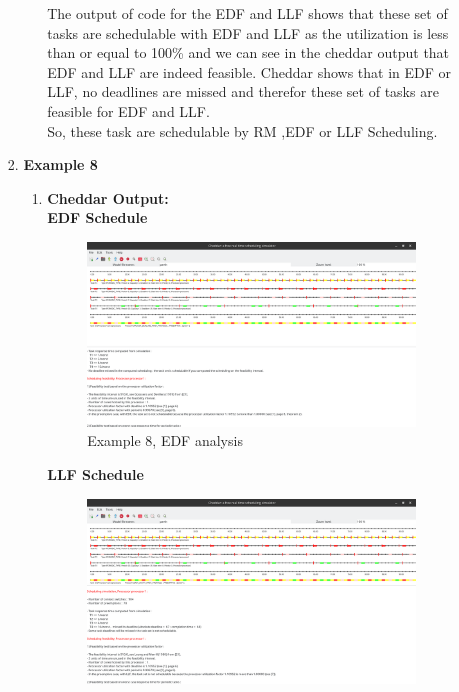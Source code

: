 \documentclass[a4paper,11pt]{article}%
\newenvironment{qanda}{\setlength{\parindent}{0pt}}{\bigskip}
\begin{document}
\begin{qanda}
\begin{enumerate}
\begin{enumerate}
\begin{enumerate}
\begin{enumerate}
						                  The output of code for the EDF and LLF shows that these set of tasks are schedulable with EDF and LLF as the utilization is less than or equal to 100\% and we can see in the cheddar output that EDF and LLF are indeed feasible. Cheddar shows that in EDF or LLF, no deadlines are missed and therefor these set of tasks are feasible for EDF and LLF.\\

						                  So, these task are schedulable by RM ,EDF or LLF Scheduling.

					            \end{enumerate}
					      \item \textbf{Example 8}
					            \begin{enumerate}
						            \item \textbf{Cheddar Output:}\\
						                  \textbf{EDF Schedule}
						                  \begin{figure}[H]
							                  \centering
							                  \includegraphics[scale=0.36]{figures/ex6_edf.png}
							                  \caption{Example 8, EDF analysis}
						                  \end{figure}
						                  \textbf{LLF Schedule}
						                  \begin{figure}[H]
							                  \centering
							                  \includegraphics[scale=0.36]{figures/ex6_llf.png}

\end{figure}
\end{enumerate}
\end{enumerate}
\end{enumerate}
\end{enumerate}
\end{qanda}
\end{document}
